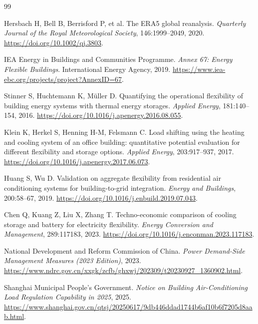 \begin{thebibliography}{99}

Hersbach H, Bell B, Berrisford P, et al.
\newblock The ERA5 global reanalysis.
\newblock \emph{Quarterly Journal of the Royal Meteorological Society},
146:1999--2049, 2020.
\newblock \url{https://doi.org/10.1002/qj.3803}.

IEA Energy in Buildings and Communities Programme.
\newblock \emph{Annex 67: Energy Flexible Buildings}.
\newblock International Energy Agency, 2019.
\newblock \url{https://www.iea-ebc.org/projects/project?AnnexID=67}.

Stinner S, Huchtemann K, Müller D.
\newblock Quantifying the operational flexibility of building energy systems
with thermal energy storages.
\newblock \emph{Applied Energy}, 181:140--154, 2016.
\newblock \url{https://doi.org/10.1016/j.apenergy.2016.08.055}.

Klein K, Herkel S, Henning H-M, Felsmann C.
\newblock Load shifting using the heating and cooling system of an office
building: quantitative potential evaluation for different flexibility and
storage options.
\newblock \emph{Applied Energy}, 203:917--937, 2017.
\newblock \url{https://doi.org/10.1016/j.apenergy.2017.06.073}.

Huang S, Wu D.
\newblock Validation on aggregate flexibility from residential air
conditioning systems for building-to-grid integration.
\newblock \emph{Energy and Buildings}, 200:58--67, 2019.
\newblock \url{https://doi.org/10.1016/j.enbuild.2019.07.043}.

Chen Q, Kuang Z, Liu X, Zhang T.
\newblock Techno-economic comparison of cooling storage and battery for
electricity flexibility.
\newblock \emph{Energy Conversion and Management}, 289:117183, 2023.
\newblock \url{https://doi.org/10.1016/j.enconman.2023.117183}.

National Development and Reform Commission of China.
\newblock \emph{Power Demand-Side Management Measures (2023 Edition)}, 2023.
\newblock \url{https://www.ndrc.gov.cn/xxgk/zcfb/ghxwj/202309/t20230927_1360902.html}.

Shanghai Municipal People's Government.
\newblock \emph{Notice on Building Air-Conditioning Load Regulation Capability
in 2025}, 2025.
\newblock \url{https://www.shanghai.gov.cn/qtsj/20250617/9db446ddad1744b6af10b6f7205d8aab.html}.


\end{thebibliography}
